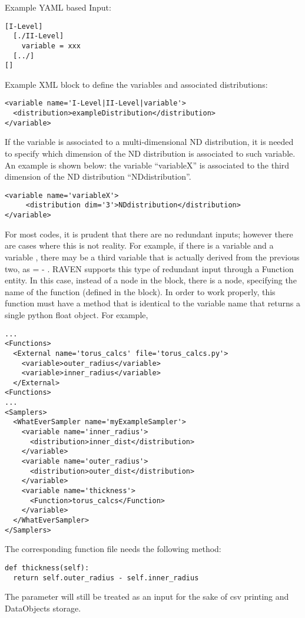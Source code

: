 
Example YAML based Input:
\begin{lstlisting}
[I-Level]
  [./II-Level]
    variable = xxx
  [../]
[]
\end{lstlisting}

Example XML block to define the variables and associated distributions:
\begin{lstlisting}[style=XML]
<variable name='I-Level|II-Level|variable'>
  <distribution>exampleDistribution</distribution>
</variable>
\end{lstlisting}

If the variable is associated to a multi-dimensional ND distribution, it is needed to specify which dimension of the ND distribution is associated to such variable. An example is shown below: the variable  ``variableX'' is associated to the third dimension of the ND distribution ``NDdistribution''.

\begin{lstlisting}[style=XML]
<variable name='variableX'>
     <distribution dim='3'>NDdistribution</distribution>
</variable>
\end{lstlisting}

For most codes, it is prudent that there are no redundant inputs; however there are
cases where this is not reality.  For example, if there is a variable  and
a variable , there may be a third variable  that
is actually derived from the previous two, as  =  - .
RAVEN supports this type of redundant input through a Function entity.  In this case,
instead of a  node in the  block, there is a
 node, specifying the name of the function (defined in the  block).
In order to work properly, this function must have a method that is identical to the variable name
that returns a single python float object.  For example,
\begin{lstlisting}[style=XML]
...
<Functions>
  <External name='torus_calcs' file='torus_calcs.py'>
    <variable>outer_radius</variable>
    <variable>inner_radius</variable>
  </External>
<Functions>
...
<Samplers>
  <WhatEverSampler name='myExampleSampler'>
    <variable name='inner_radius'>
      <distribution>inner_dist</distribution>
    </variable>
    <variable name='outer_radius'>
      <distribution>outer_dist</distribution>
    </variable>
    <variable name='thickness'>
      <Function>torus_calcs</Function>
    </variable>
  </WhatEverSampler>
</Samplers>
\end{lstlisting}
The corresponding function file  needs the following method:
\begin{lstlisting}
def thickness(self):
  return self.outer_radius - self.inner_radius
\end{lstlisting}
The  parameter will still be treated as an input for the sake of csv
printing and DataObjects storage.

